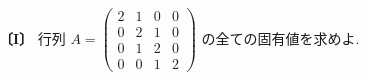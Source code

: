 \noindent\textbf{〔I〕}
行列 $A=\begin{pmatrix}
2 & 1 & 0 & 0\\
0 & 2 & 1 & 0\\
0 & 1 & 2 & 0\\
0 & 0 & 1 & 2
\end{pmatrix}$ の全ての固有値を求めよ.
